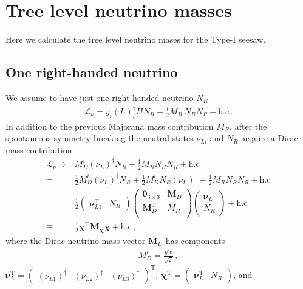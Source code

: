 \chapter{Tree level neutrino masses}
Here we calculate the tree level neutrino mases for the Type-I seesaw.

\section{One right-handed neutrino}
We assume to have just one right-handed neutrino $N_R$ 
\begin{align}
  \mathcal{L}_{\nu}=y_{i} \left( L \right)^{\dagger}_i H  N_R 
  +\tfrac{1}{2} M_R\, N_R  N_R + \text{h.c}\,.
\end{align}
In addition to the previous Majorana mass contribution $M_R$, after the spontaneous symmetry breaking the neutral states $\nu_{Li}$ and $N_R$  acquire a Dirac mass contribution
\begin{align}
  \mathcal{L}_{\nu}\supset & M_D^{i} \left( \nu_{L} \right)^{\dagger} N_R +\frac{1}{2} M_R N_R N_R +\text{h.c} \nonumber\\
  =&  \frac{1}{2}M_D^{i} \left( \nu_{L} \right)^{\dagger} N_R
     +\frac{1}{2}M_D^{i} N_R\left( \nu_{L} \right)^{\dagger} +\frac{1}{2} M_R N_R N_R +\text{h.c} \nonumber\\
  =&\frac{1}{2}\begin{pmatrix} \boldsymbol{\nu}_{L1}^{\operatorname{T}}  & N_R  \end{pmatrix}
 \begin{pmatrix}
   \mathbf{0}_{3 \times 3} &            \boldsymbol{M}_D \\
   \boldsymbol{M}_D^{\operatorname{T}} & M_R \\
 \end{pmatrix}
\begin{pmatrix} \boldsymbol{\nu}_{L}  \\
    N_R  \end{pmatrix}+\text{h.c} \nonumber\\
  \equiv&\frac{1}{2} \boldsymbol{\chi}^{\operatorname{T}} \boldsymbol{M_{\chi}} \boldsymbol{\chi}+\text{h.c}\,,
\end{align}
where the Dirac neutrino mass vector $\boldsymbol{M}_D$ has components
\begin{align}
  M_D^i=\frac{y^i v}{\sqrt{2}}\,,
\end{align}
 $\boldsymbol{\nu}_{L}^{\operatorname{T}}=
\begin{pmatrix}\left( \nu_{L1} \right)^{\dagger}& \left(\nu_{L2} \right)^{\dagger} & \left(\nu_{L3} \right)^{\dagger}\end{pmatrix}^{\operatorname{T}}$, $\boldsymbol{\chi}^{\operatorname{T}}=\begin{pmatrix} \boldsymbol{\nu}_{L}^{\operatorname{T}}  & N_R  \end{pmatrix}$, and
